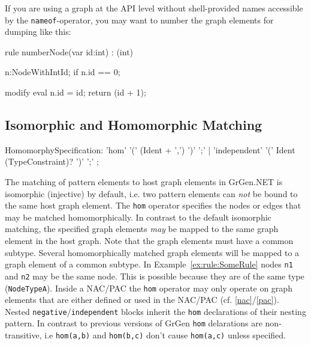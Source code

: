 \begin{note}
If you are using a graph at the API level without shell-provided names accessible by the \texttt{nameof}-operator, you may want to number the graph elements for dumping like this:
\begin{grgen}
rule numberNode(var id:int) : (int)
{
  n:NodeWithIntId;
  if { n.id == 0; }

  modify {
    eval {
      n.id = id;
    }
    return (id + 1);
  }
}
\end{grgen}
\end{note}


\subsection{Isomorphic and Homomorphic Matching}\label{rule:homspec}

\begin{rail}
  HomomorphySpecification:
    'hom' '(' (Ident + ',') ')' ';' |
    'independent' '(' Ident (TypeConstraint)? ')' ';'
    ;
\end{rail}

The matching of pattern elements to host graph elements in GrGen.NET is isomorphic (injective) by default, 
i.e. two pattern elements can \emph{not} be bound to the same host graph element.
The \texttt{hom} operator specifies the nodes or edges that may be matched homomorphically.
In contrast to the default isomorphic matching, the specified graph elements \emph{may} be mapped to the same graph element in the host graph. Note that the graph elements must have a common subtype.
Several homomorphically matched graph elements will be mapped to a graph element of a common subtype.
In Example~\ref{ex:rule:SomeRule} nodes \texttt{n1} and \texttt{n2} may be the same node. This is possible because they are of the same type (\texttt{NodeTypeA}).
Inside a NAC/PAC the \texttt{hom} operator may only operate on graph elements that are either defined or used in the NAC/PAC (cf. \ref{nac}/\ref{pac}).
Nested \texttt{negative}/\texttt{independent} blocks inherit the \texttt{hom} declarations of their nesting pattern.
In contrast to previous versions of GrGen \texttt{hom} delarations are non-transitive, i.e \texttt{hom(a,b)} and \texttt{hom(b,c)} don't cause \texttt{hom(a,c)} unless specified.

